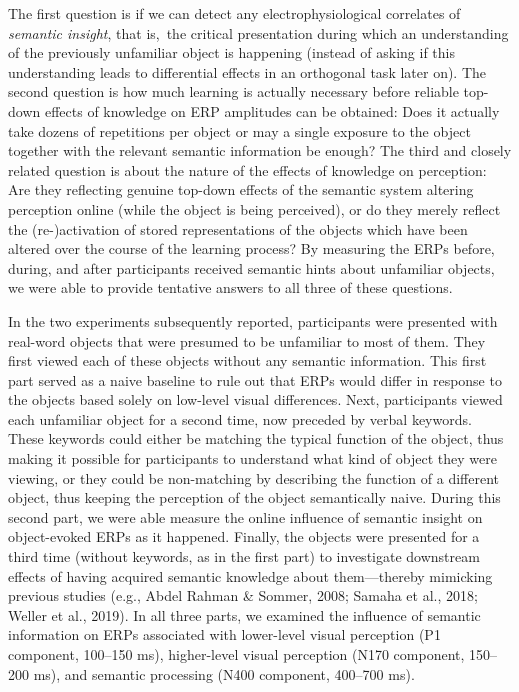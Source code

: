 \documentclass[
  english,
  doc,12pt,twoside,floatsintext]{apa7}
\begin{document}
The first question is if we can detect any electrophysiological correlates of \emph{semantic insight}, that is,~the critical presentation during which an understanding of the previously unfamiliar object is happening (instead of asking if this understanding leads to differential effects in an orthogonal task later on). The second question is how much learning is actually necessary before reliable top-down effects of knowledge on ERP amplitudes can be obtained: Does it actually take dozens of repetitions per object or may a single exposure to the object together with the relevant semantic information be enough? The third and closely related question is about the nature of the effects of knowledge on perception: Are they reflecting genuine top-down effects of the semantic system altering perception online (while the object is being perceived), or do they merely reflect the (re-)activation of stored representations of the objects which have been altered over the course of the learning process? By measuring the ERPs before, during, and after participants received semantic hints about unfamiliar objects, we were able to provide tentative answers to all three of these questions.

In the two experiments subsequently reported, participants were presented with real-word objects that were presumed to be unfamiliar to most of them. They first viewed each of these objects without any semantic information. This first part served as a naive baseline to rule out that ERPs would differ in response to the objects based solely on low-level visual differences. Next, participants viewed each unfamiliar object for a second time, now preceded by verbal keywords. These keywords could either be matching the typical function of the object, thus making it possible for participants to understand what kind of object they were viewing, or they could be non-matching by describing the function of a different object, thus keeping the perception of the object semantically naive. During this second part, we were able measure the online influence of semantic insight on object-evoked ERPs as it happened. Finally, the objects were presented for a third time (without keywords, as in the first part) to investigate downstream effects of having acquired semantic knowledge about them---thereby mimicking previous studies (e.g., Abdel Rahman \& Sommer, 2008; Samaha et al., 2018; Weller et al., 2019). In all three parts, we examined the influence of semantic information on ERPs associated with lower-level visual perception (P1 component, 100--150 ms), higher-level visual perception (N170 component, 150--200 ms), and semantic processing (N400 component, 400--700 ms).
\end{document}
